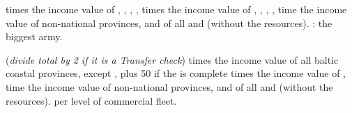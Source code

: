  times the income value of ,
, ,
, 
 times the income value of ,
, , ,
 time the income value of non-national provinces, and of all \COL and
\TP (without the resources).
 \VPs: the biggest army.

\bparag ({\it divide total by 2 if it is a Transfer check})
 times the income value of all baltic coastal provinces, except
, plus 50 \VPs if the 
is complete
 times the income value of ,
 time the income value of non-national provinces, and of all \COL and
\TP (without the resources).
 \VP per level of commercial fleet.








